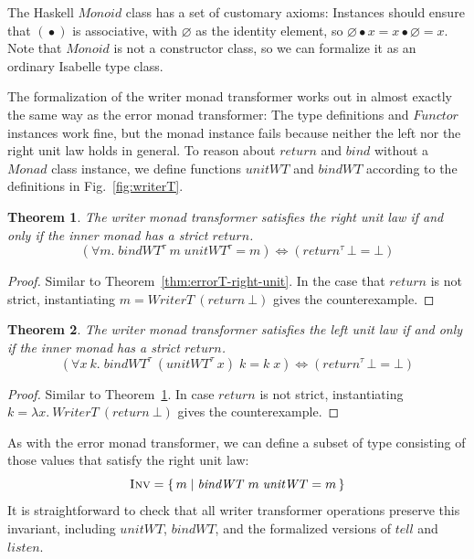 \documentclass{sigplanconf}
\newcommand{\mempty}{\varnothing}
\newcommand{\mappend}{\mathrel{\bullet}}
\newcommand{\hsc}[1]{\ensuremath{\mathit{#1}}}
\newcommand{\INV}{\text{\textsc{Inv}}}
\newcommand{\tT}{\tau}
\newtheorem{theorem}{Theorem}
\theoremstyle{definition}
\begin{document}
The Haskell \hsc{Monoid} class has a set of customary axioms: Instances should ensure that $(\mappend)$ is associative, with $\mempty$ as the identity element, so $\mempty \mappend x = x \mappend \mempty = x$. Note that \hsc{Monoid} is not a constructor class, so we can formalize it as an ordinary Isabelle type class.

The formalization of the writer monad transformer works out in almost exactly the same way as the error monad transformer: The type definitions and \hsc{Functor} instances work fine, but the monad instance fails because neither the left nor the right unit law holds in general. To reason about \hsc{return} and \hsc{bind} without a \hsc{Monad} class instance, we define functions \hsc{unitWT} and \hsc{bindWT} according to the definitions in Fig.~\ref{fig:writerT}.

\begin{theorem}
\label{thm:writerT-right-unit}
The writer monad transformer satisfies the right unit law if and only if the inner monad has a strict \hsc{return}.
%
\begin{equation*}
(\forall{m}.\;\hsc{bindWT}^\tT\:m\;\hsc{unitWT}^\tT = m) \Longleftrightarrow
(\hsc{return}^\tT\,\bot = \bot)
\end{equation*}
\end{theorem}
\begin{proof}
Similar to Theorem~\ref{thm:errorT-right-unit}. In the case that \hsc{return} is not strict, instantiating $m = \hsc{WriterT}\:(\hsc{return}\:\bot)$ gives the counterexample.
\end{proof}

\begin{theorem}
\label{thm:writerT-left-unit}
The writer monad transformer satisfies the left unit law if and only if the inner monad has a strict \hsc{return}.
%
\begin{equation*}
(\forall{x}\:{k}.\;\hsc{bindWT}^\tT\:(\hsc{unitWT}^\tT\:x)\;k = k\;x) \Longleftrightarrow
(\hsc{return}^\tT\,\bot = \bot)
\end{equation*}
\end{theorem}
\begin{proof}
Similar to Theorem~\ref{thm:writerT-right-unit}. In case \hsc{return} is not strict, instantiating $k = \lambda{x}.\:\hsc{WriterT}\:(\hsc{return}\:\bot)$ gives the counterexample.
\end{proof}

As with the error monad transformer, we can define a subset of type consisting of those values that satisfy the right unit law:
%
\begin{equation}
  \INV = \{\,m \mid \hsc{bindWT}\;m\;\hsc{unitWT} = m\,\}
\end{equation}
%
It is straightforward to check that all writer transformer operations preserve this invariant, including \hsc{unitWT}, \hsc{bindWT}, and the formalized versions of \hsc{tell} and \hsc{listen}.
\end{document}
